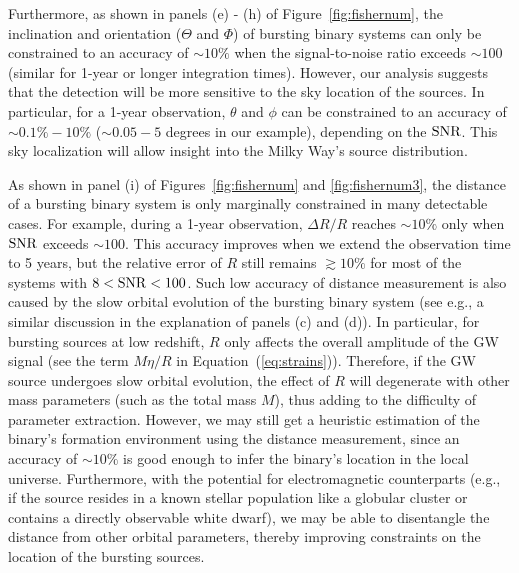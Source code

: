 \documentclass[%
 reprint,
 amsmath,amssymb,
 aps,
]{revtex4-2}
\newcommand{\xzy}[1]{\textcolor{red}{{\bf} #1}}
\begin{document}
Furthermore, as shown in panels (e) - (h) of Figure~\ref{fig:fishernum}, the inclination and orientation ($\Theta$ and $\Phi$) of bursting binary systems can only be constrained to an accuracy of $\sim 10\%$ when the signal-to-noise ratio exceeds $\sim 100$ (similar for 1-year or longer integration times). However, our analysis suggests that the detection will be more sensitive to the sky location of the sources. In particular, for a 1-year observation, $\theta$ and $\phi$ can be constrained to an accuracy of $\sim 0.1\% - 10\%$ ($\sim 0.05-5$ degrees in our example), depending on the $\rm SNR$. This sky localization will allow insight into the Milky Way's source distribution. 


As shown in panel (i) of Figures~\ref{fig:fishernum} and \ref{fig:fishernum3}, the distance of a bursting binary system is only marginally constrained in many detectable cases. For example, during a 1-year observation, $\Delta R/R$ reaches $\sim 10\%$ only when $\rm SNR$ exceeds $\sim 100$. This accuracy improves when we extend the observation time to 5 years, but the relative error of $R$ still remains $\gtrsim 10\%$ for most of the systems with $8<{\rm SNR} <100$. Such low accuracy of distance measurement is also caused by the slow orbital evolution of the bursting binary system (see e.g., a similar discussion in the explanation of panels (c) and (d)). In particular, for bursting sources at low redshift, $R$ only affects the overall amplitude of the GW signal (see the term $M\eta/R$ in Equation~(\ref{eq:strains})). Therefore, if the GW source undergoes slow orbital evolution, the effect of $R$ will degenerate with other mass parameters (such as the total mass $M$), thus adding to the difficulty of parameter extraction. However, we may still get a heuristic estimation of the binary's formation environment using the distance measurement, since an accuracy of $\sim 10\%$ is good enough to infer the binary's location in the local universe. Furthermore, with the potential for electromagnetic counterparts (e.g., if the source resides in a known stellar population like a globular cluster or contains a directly observable white dwarf), we may be able to disentangle the distance from other orbital parameters, thereby improving constraints on the location of the bursting sources.

\end{document}
